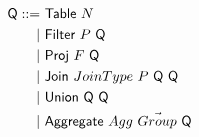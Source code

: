 \begin{align*}
  \textsf{Q} ::=~&\textsf{Table}~N\\
         |~&\textsf{Filter}~P~\textsf{Q}\\
         |~&\textsf{Proj}~F~\textsf{Q}~\\
         |~&\textsf{Join}~JoinType~P~\textsf{Q}~\textsf{Q}\\
         |~&\textsf{Union}~\textsf{Q}~\textsf{Q}~ \\
         |~&\textsf{Aggregate}~Agg~\vec{Group}~\textsf{Q}\\
\end{align*}
